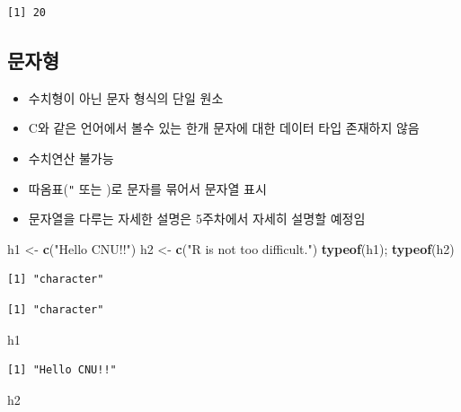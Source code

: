 \documentclass[
  11pt,
]{krantz}
\newenvironment{Shaded}{\begin{snugshade}}{\end{snugshade}}
\newcommand{\KeywordTok}[1]{\textcolor[rgb]{0.27,0.27,0.27}{\textbf{#1}}}
\newcommand{\NormalTok}[1]{#1}
\newcommand{\StringTok}[1]{\textcolor[rgb]{0.5,0.5,0.5}{#1}}
\providecommand{\tightlist}{%
  \setlength{\itemsep}{0pt}\setlength{\parskip}{0pt}}
\begin{document}
\begin{verbatim}
[1] 20
\end{verbatim}

\normalsize

\hypertarget{character}{%
\subsection{문자형}\label{character}}

\begin{itemize}
\tightlist
\item
  수치형이 아닌 문자 형식의 단일 원소
\item
  C와 같은 언어에서 볼수 있는 한개 문자에 대한 데이터 타입 존재하지 않음
\item
  수치연산 불가능
\item
  따옴표(\texttt{"} 또는 \texttt{\textquotesingle{}})로 문자를 묶어서 문자열 표시
\item
  문자열을 다루는 자세한 설명은 5주차에서 자세히 설명할 예정임
\end{itemize}

\footnotesize

\begin{Shaded}
\begin{Highlighting}[]
\NormalTok{h1 <-}\StringTok{ }\KeywordTok{c}\NormalTok{(}\StringTok{"Hello CNU!!"}\NormalTok{)}
\NormalTok{h2 <-}\StringTok{ }\KeywordTok{c}\NormalTok{(}\StringTok{"R is not too difficult."}\NormalTok{)}
\KeywordTok{typeof}\NormalTok{(h1); }\KeywordTok{typeof}\NormalTok{(h2)}
\end{Highlighting}
\end{Shaded}

\begin{verbatim}
[1] "character"
\end{verbatim}

\begin{verbatim}
[1] "character"
\end{verbatim}

\begin{Shaded}
\begin{Highlighting}[]
\NormalTok{h1}
\end{Highlighting}
\end{Shaded}

\begin{verbatim}
[1] "Hello CNU!!"
\end{verbatim}

\begin{Shaded}
\begin{Highlighting}[]
\NormalTok{h2}
\end{Highlighting}
\end{Shaded}
\end{document}
